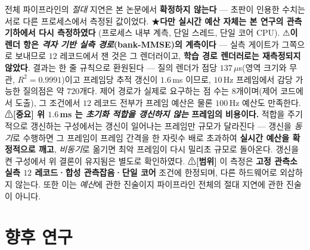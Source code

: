 \documentclass[11pt]{report}
\numberwithin{equation}{chapter}
\numberwithin{figure}{chapter}
\numberwithin{table}{chapter}
\begin{document}
전체 파이프라인의 \emph{절대} 지연은 본 논문에서 \textbf{확정하지 않는다} ---
초판이 인용한 수치는 서로 다른 프로세스에서 측정된 값이었다.
★\textbf{다만 실시간 예산 자체는 본 연구의 관측 기하에서 다시 측정하였다}
(프로세스 내부 계측, 단일 스레드, 단일 코어 CPU).
⚠\textbf{이 렌더 항은 \emph{격자 기반 실측 경로}(bank-MMSE)의 계측이다} --- 실측 게이트가 그쪽으로 보내므로 $12$ 레코드에서 잰 것은 그 렌더러이고, \textbf{학습 경로 렌더러로는 재측정되지 않았다}.  결과는 한 줄 규칙으로 환원된다 ---
질의 렌더가 점당 $137\,\mu$s(영역 크기와 무관, $R^2 = 0.9991$)이고 프레임당 추적 갱신이
$1.6$\,ms 이므로, $10$\,Hz 프레임에서 감당 가능한 질의점은 약 $720$개다. 제어 경로가
실제로 요구하는 점 수는 $8$개이며(제어 코드에서 도출), 그 조건에서 $12$ 레코드 전부가
프레임 예산은 물론 $100$\,Hz 예산도 만족한다.
⚠\textbf{[중요] 위 $1.6$\,ms 는 \emph{초기화 적합을 갱신하지 않는} 프레임의 비용이다.}
적합을 주기적으로 갱신하는 구성에서는 갱신이 일어나는 프레임만 규모가 달라진다 ---
갱신을 \emph{동기}로 수행하면 그 프레임이 프레임 간격을 한 자릿수 배로 초과하여
\textbf{실시간 예산을 확정적으로 깨고}, \emph{비동기}로 옮기면 최악 프레임이 다시
밀리초 규모로 돌아온다. 갱신을 켠 구성에서 위 결론이 유지됨은 별도로 확인하였다.
⚠\textbf{[범위]} 이 측정은 \textbf{고정 관측소 실측 $12$ 레코드·합성 관측잡음·단일 코어}
조건에 한정되며, 다른 하드웨어로 외삽하지 않는다. 또한 이는 \emph{예산}에 관한 진술이지
파이프라인 전체의 절대 지연에 관한 진술이 아니다.

\section{향후 연구}
\label{sec:future_work}
\end{document}
